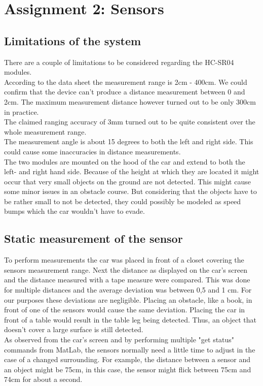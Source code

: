 \documentclass[final]{scrreprt} %
\begin{document}
\chapter{Assignment 2: Sensors}
\label{ch:mod2-ass2}

\section{Limitations of the system}

There are a couple of limitations to be considered regarding the HC-SR04 modules.\\
According to the data sheet the measurement range is 2cm - 400cm. We could confirm that the device can't produce a distance measurement between 0 and 2cm. The maximum measurement distance however turned out to be only 300cm in practice.\\ 
The claimed ranging accuracy of 3mm turned out to be quite consistent over the whole measurement range.\\
The measurement angle is about 15 degrees to both the left and right side. This could cause some inaccuracies in distance measurements.\\
The two modules are mounted on the hood of the car and extend to both the left- and right hand side. Because of the height at which they are located it might occur that very small objects on the ground are not detected. This might cause some minor issues in an obstacle course. But considering that the objects have to be rather small to not be detected, they could possibly be modeled as speed bumps which the car wouldn't have to evade.

\section{Static measurement of the sensor}

To perform measurements the car was placed in front of a closet covering the sensors measurement range. Next the distance as displayed on the car's screen and the distance measured with a tape measure were compared. This was done for multiple distances and the average deviation was between 0,5 and 1 cm. For our purposes these deviations are negligible. Placing an obstacle, like a book, in front of one of the sensors would cause the same deviation. Placing the car in front of a table would result in the table leg being detected. Thus, an object that doesn't cover a large surface is still detected.\\ As observed from the car's screen and by performing multiple "get status" commands from MatLab, the sensors normally need a little time to adjust in the case of a changed surrounding. For example, the distance between a sensor and an object might be 75cm, in this case, the sensor might flick between 75cm and 74cm for about a second.
\end{document}
